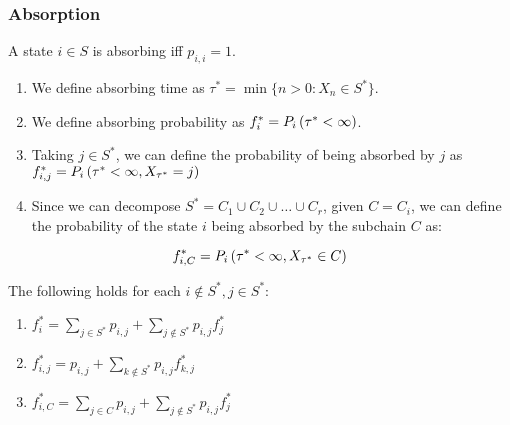  \begin{frame} \frametitle{Absorption}
    \vspace{2em}
    
    \begin{definition}
    A state \(i\in S\) is absorbing iff \(p_{i,i} = 1\).
    \end{definition}
  
  \begin{definition}
    \begin{enumerate}
    \item We define absorbing time as \(\tau^{\ast} = \min \{n > 0: X_n \in S^{\ast}\}\).
    \item We define absorbing probability as \(f_{i}^{\ast} = P_i\left({\tau^{\ast} < \infty}\right)\).
    \item Taking \(j\in S^{\ast}\), we can define the probability of being absorbed by \(j\) as \(f_{i,j}^{\ast} = P_i\left({\tau^{\ast} < \infty, X_{\tau^{\ast}} = j}\right)\)
    \item Since we can decompose \(S^{\ast} = C_1 \cup C_2 \cup \ldots \cup C_r\), given \(C = C_i\), we can define the probability of the state \(i\) being absorbed by the subchain \(C\) as:
    \end{enumerate}

    \[
    f_{i,C}^{\ast} = P_i\left({\tau^{\ast} < \infty, X_{\tau^{\ast}} \in C}\right)
    \]
    \end{definition}

    \begin{proposition}
    The following holds for each \(i \not\in S^{\ast}, j\in S^{\ast}\):

    \begin{enumerate}
    \item \(f_i^{\ast} = \sum_{j \in S^{\ast}} p_{i,j} + \sum_{j \not\in S^{\ast}} p_{i,j} f_{j}^{\ast}\)
    \item \(f_{i,j}^{\ast} = p_{i,j} + \sum_{k \not\in S^{\ast}} p_{i,j} f_{k,j}^{\ast}\)
    \item \(f_{i,C}^{\ast} = \sum_{j \in C} p_{i,j} + \sum_{j \not\in S^{\ast}} p_{i,j} f_{j}^{\ast}\)
    \end{enumerate}
    \end{proposition}
 \end{frame}
 
